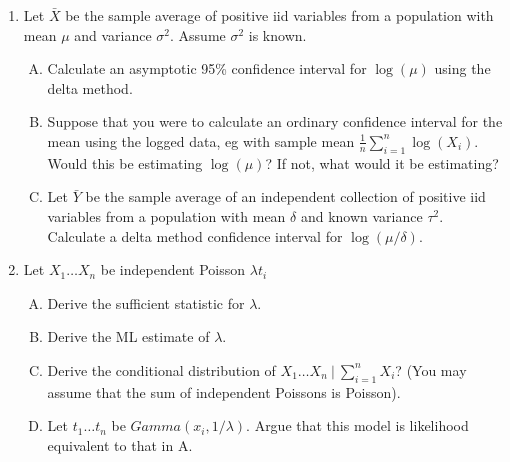 \documentclass[12pt]{article}
\begin{document}
\begin{enumerate}[1.]
\item Let $\bar X$ be the sample average of positive iid variables from a population with mean $\mu$ and variance $\sigma^2$. Assume $\sigma^2$ is known. 
  \begin{enumerate}[A.]
  \item Calculate an asymptotic 95\% confidence interval for $\log(\mu)$ using the delta method.
  \item Suppose that you were to calculate an ordinary confidence interval for the mean using the logged data, eg with sample mean $\frac{1}{n} \sum_{i=1}^n \log(X_i)$.
    Would this be estimating $\log(\mu)$? If not, what would it be estimating?
  \item Let $\bar Y$ be the sample average of an independent collection of positive iid variables from a population with 
    mean $\delta$ and known variance $\tau^2$. Calculate a delta method confidence interval for $\log(\mu/\delta)$.
  \end{enumerate}

\newpage

\item Let $X_1\ldots X_n$ be independent Poisson $\lambda t_i$
  \begin{enumerate}[A.]
  \item Derive the sufficient statistic for $\lambda$.
  \item Derive the ML estimate of $\lambda$.
  \item Derive the conditional distribution of $X_1 \ldots X_n ~|~ \sum_{i=1}^n X_i$? (You may assume that the sum of independent Poissons is Poisson).
  \item Let $t_1\ldots t_n$ be $Gamma(x_i, 1/\lambda)$. Argue that this model is likelihood equivalent to that in A.
  \end{enumerate}

\end{enumerate}
\end{document}
